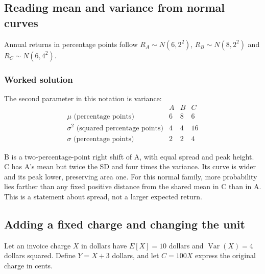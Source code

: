 \subsection{Reading mean and variance from normal curves}\label{prob:sec:general-worked1}
Annual returns in percentage points follow $R_A\sim N(6,2^2)$, $R_B\sim N(8,2^2)$ and $R_C\sim N(6,4^2)$.
\subsubsection*{Worked solution}\label{sol:sec:general-worked1}
The second parameter in this notation is variance:
\[
\begin{array}{c|rrr}
& A&B&C\\ \hline
\mu\text{ (percentage points)}&6&8&6\\
\sigma^2\text{ (squared percentage points)}&4&4&16\\
\sigma\text{ (percentage points)}&2&2&4
\end{array}
\]
\begin{center}\end{center}
B is a two-percentage-point right shift of A, with equal spread and peak height. C has A's mean but twice the SD and four times the variance. Its curve is wider and its peak lower, preserving area one. For this normal family, more probability lies farther than any fixed positive distance from the shared mean in C than in A. This is a statement about spread, not a larger expected return.


\subsection{Adding a fixed charge and changing the unit}\label{prob:sec:general-worked2}
Let an invoice charge $X$ in dollars have $E[X]=10$ dollars and $\operatorname{Var}(X)=4$ dollars squared. Define $Y=X+3$ dollars, and let $C=100X$ express the original charge in cents.
